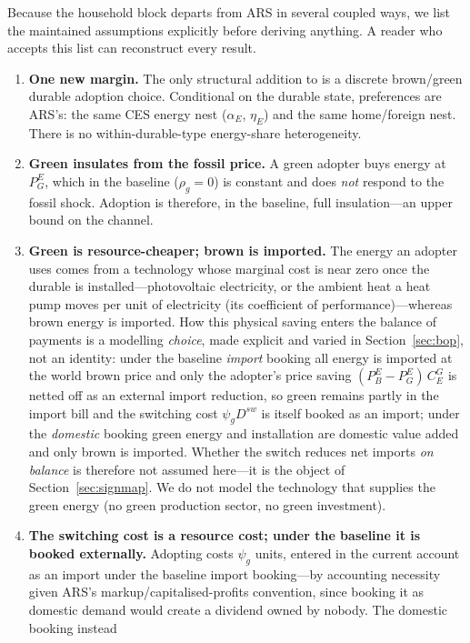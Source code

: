 \documentclass[11pt,a4paper]{article}
\begin{document}
Because the household block departs from ARS in several coupled ways, we list
the maintained assumptions explicitly before deriving anything. A reader who
accepts this list can reconstruct every result.

\begin{enumerate}\itemsep2pt
\item \textbf{One new margin.} The only structural addition to \citet{ARS2024}
is a discrete brown/green durable adoption choice. Conditional on the durable
state, preferences are ARS's: the same CES energy nest ($\alpha_E$, $\eta_E$)
and the same home/foreign nest. There is no within-durable-type
energy-share heterogeneity.
\item \textbf{Green insulates from the fossil price.} A green adopter buys
energy at $P^{E}_{G}$, which in the baseline ($\rho_g=0$) is constant and does
\emph{not} respond to the fossil shock. Adoption is therefore, in the baseline,
full insulation---an upper bound on the channel.
\item \textbf{Green is resource-cheaper; brown is imported.} The energy an
adopter uses comes from a technology whose marginal cost is near zero once the
durable is installed---photovoltaic electricity, or the ambient heat a heat
pump moves per unit of electricity (its coefficient of performance)---whereas
brown energy is imported. How this physical saving enters the balance of
payments is a modelling \emph{choice}, made explicit and varied in
Section~\ref{sec:bop}, not an identity: under the baseline \emph{import} booking
all energy is imported at the world brown price and only the adopter's price
saving $(P^{E}_{B}-P^{E}_{G})\,C^{G}_{E}$ is netted off as an external import
reduction, so green remains partly in the import bill and the switching cost
$\psi_g D^{sw}$ is itself booked as an import; under the \emph{domestic} booking
green energy and installation are domestic value added and only brown is
imported. Whether the switch reduces net imports \emph{on balance} is therefore
not assumed here---it is the object of Section~\ref{sec:signmap}. We do not
model the technology that supplies the green energy (no green production sector,
no green investment).
\item \textbf{The switching cost is a resource cost; under the baseline it is
booked externally.} Adopting costs $\psi_g$ units, entered in the current
account as an import under the baseline import booking---by accounting necessity
given ARS's markup/capitalised-profits convention, since booking it as domestic
demand would create a dividend owned by nobody. The domestic booking instead

\end{enumerate}
\end{document}
